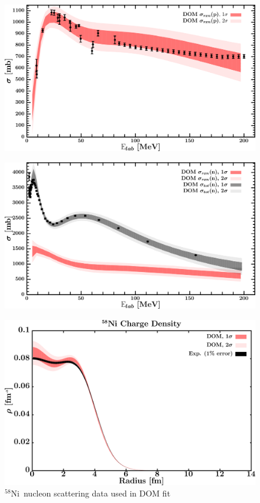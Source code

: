 \documentclass[twocolumn,secnumarabic,amssymb, nobibnotes, aps, prl,
superscriptaddress, nobalancelastpage, draft]{revtex4}
\newcommand{\niEight}{\ensuremath{^{58}}N\lowercase{i}}
\begin{document}
\begin{figure}[!htb]
\begin{minipage}{0.4\linewidth}
        \label{DOM_ni58_neutron_elastic}
    \end{minipage}
    \centering
    \begin{minipage}{0.4\linewidth}
        \centering
        \includegraphics[width=\linewidth]{figures/ni58_protonInelastic.png}
        \label{DOM_ni58_proton_inelastic}
    \end{minipage}\hspace{6pt}
    \begin{minipage}{0.4\linewidth}
        \centering
        \includegraphics[width=\linewidth]{figures/ni58_neutronInelastic.png}
        \label{DOM_ni58_neutron_inelastic}
    \end{minipage}
    \caption{\niEight\ nucleon scattering data used in DOM fit}
    \label{DOM_ni58_scattering}
    \centering
    \begin{minipage}{0.4\linewidth}
        \centering
        \includegraphics[width=\linewidth]{figures/ni58_chargeDensity.png}

\end{minipage}
\end{figure}
\end{document}
